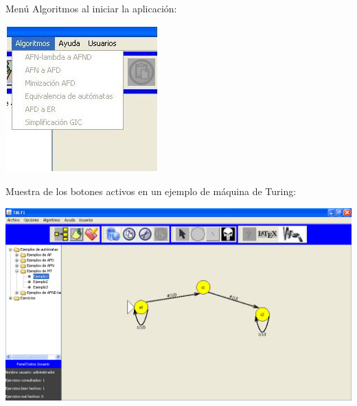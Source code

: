 \documentclass[12pt,a4paper,spanish]{book}
\begin{document}
Men\'u Algoritmos al iniciar la aplicaci\'on:\\
\begin{center}
\includegraphics[width=\textwidth]{roci4.jpg}
\end{center}
Muestra de los botones activos en un ejemplo de m\'aquina de Turing:\\
\begin{center}
\includegraphics[width=\textwidth]{roci52.jpg}
\end{center}
\end{document}
